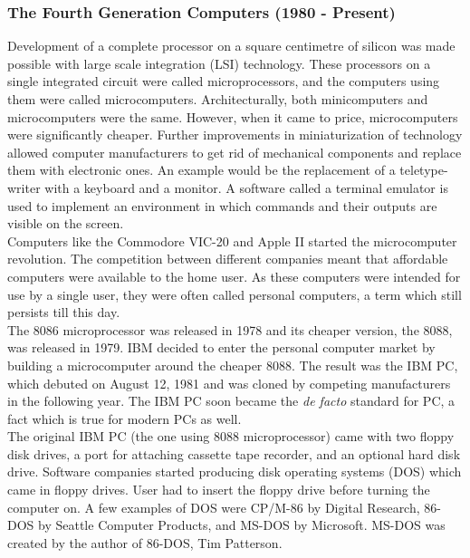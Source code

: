 \subsubsection{The Fourth Generation Computers (1980 - Present)}
Development of a complete processor on a square centimetre of silicon was made possible with large scale integration (LSI) technology. These processors on a single integrated circuit were called microprocessors, and the computers using them were called microcomputers. Architecturally, both minicomputers and microcomputers were the same. However, when it came to price, microcomputers were significantly cheaper. Further improvements in miniaturization of technology allowed computer manufacturers to get rid of mechanical components and replace them with electronic ones. An example would be the replacement of a teletype-writer with a keyboard and a monitor. A software called a terminal emulator is used to implement an environment in which commands and their outputs are visible on the screen.\\
Computers like the Commodore VIC-20 and Apple II started the microcomputer revolution. The competition between different companies meant that affordable computers were available to the home user. As these computers were intended for use by a single user, they were often called personal computers, a term which still persists till this day.\\
The 8086 microprocessor was released in 1978 and its cheaper version, the 8088, was released in 1979. IBM decided to enter the personal computer market by building a microcomputer around the cheaper 8088. The result was the IBM PC, which debuted on August 12, 1981 \cite{ibmarchpc} and was cloned by competing manufacturers in the following year. The IBM PC soon became the \textit{de facto} standard for PC, a fact which is true for modern PCs as well.\\
The original IBM PC (the one using 8088 microprocessor) came with two floppy disk drives, a port for attaching cassette tape recorder, and an optional hard disk drive. Software companies started producing disk operating systems (DOS) which came in floppy drives. User had to insert the floppy drive before turning the computer on. A few examples of DOS were CP/M-86 by Digital Research, 86-DOS by Seattle Computer Products, and MS-DOS by Microsoft. MS-DOS was created by the author of 86-DOS, Tim Patterson.\\
